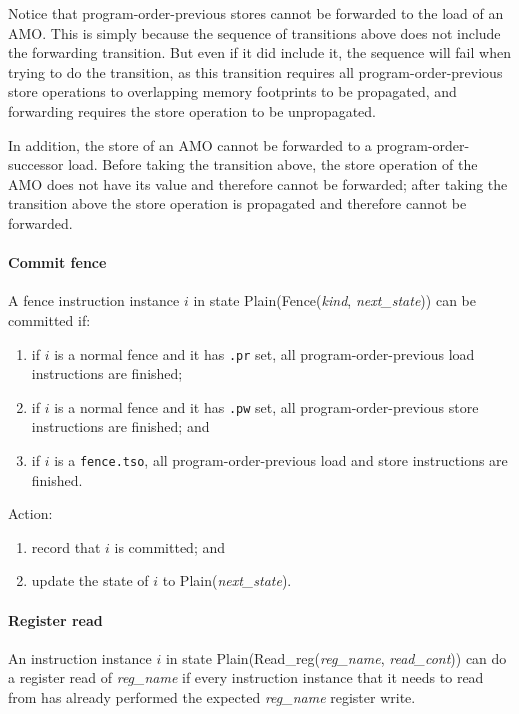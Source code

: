 \begin{commentary}
Notice that program-order-previous stores cannot be forwarded to the load of an AMO.
This is simply because the sequence of transitions above does not include the forwarding transition.
But even if it did include it, the sequence will fail when trying to do the  transition, as this transition requires all program-order-previous store operations to overlapping memory footprints to be propagated, and forwarding requires the store operation to be unpropagated.

In addition, the store of an AMO cannot be forwarded to a program-order-successor load.
Before taking the transition above, the store operation of the AMO does not have its value and therefore cannot be forwarded; after taking the transition above the store operation is propagated and therefore cannot be forwarded.
\end{commentary}


\paragraph{Commit fence}\label{omm:commit_fence}
A fence instruction instance $i$ in state {\sc Plain}({\sc Fence}({\it kind}, {\it next\_state})) can be committed if:
\begin{enumerate}
\item if $i$ is a normal fence and it has {\tt .pr} set, all program-order-previous load instructions are finished;
\item if $i$ is a normal fence and it has {\tt .pw} set, all program-order-previous store instructions are finished; and
\item if $i$ is a {\tt fence.tso}, all program-order-previous load and store instructions are finished.
\end{enumerate}
Action:
\begin{enumerate}
\item record that $i$ is committed; and
\item update the state of $i$ to {\sc Plain}({\it next\_state}).
\end{enumerate}


\paragraph{Register read}\label{omm:reg_read}
An instruction instance $i$ in state {\sc Plain}({\sc Read\_reg}({\it reg\_name}, {\it read\_cont})) can do a register read of {\it reg\_name} if every instruction instance that it needs to read from has already performed the expected {\it reg\_name} register write.

